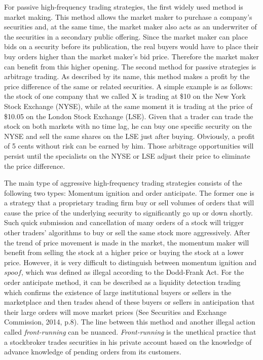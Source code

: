For passive high-frequency trading strategies,  the first widely used method is market making. This method allows the market maker to purchase a company's securities and,  at the same time,  the market maker also acts as an underwriter of the 
securities in a secondary public offering. Since the market maker can place bids on a security before its publication,  the real buyers would have to place their buy orders higher than the market maker's bid price. Therefore the market maker can  benefit from this higher opening. The second method for passive strategies is arbitrage trading. As described by its name,  this method makes a profit by the price difference of the same or related securities. A simple example is as follows: the stock of one company that we called X is trading at \$10 on the New York Stock Exchange (NYSE),  while at the same moment it is trading at the price of \$10.05 on the London Stock Exchange (LSE).  Given that a trader can trade the stock on both markets with no time lag,  he can buy one specific security on the NYSE and sell the same shares on the LSE just after buying. Obviously,  a profit of 5 cents without risk can be earned by him. Those arbitrage opportunities will persist until the specialists on the NYSE or LSE adjust their price to eliminate the price difference.

The main type of aggressive high-frequency trading strategies consists of the following two types:
Momentum ignition and order anticipate. The former one is a strategy that a proprietary trading firm buy or sell volumes of orders that will cause the price of the underlying security to significantly go up or down shortly. Such quick submission and cancellation of many orders of a stock will trigger other traders' algorithms to buy or sell the same stock more aggressively. After the trend of price movement is made in the market,  the momentum maker will benefit from selling the stock at a higher price or buying the stock at a lower price. However,  it is very difficult to distinguish between momentum ignition and $\textit{spoof}$,  which was defined as illegal according to the Dodd-Frank Act.  For the order anticipate method,  it can be described as a liquidity detection trading which confirms the existence of large institutional buyers or sellers in the marketplace and then trades ahead of these buyers or sellers in anticipation that their large orders will move market prices  (See Securities and Exchange Commission, 2014, p.8). The line between this method and another illegal action called \textit{front-running} can be nuanced. \textit{Front-running} is the unethical practice that a stockbroker trades securities in his private account based on the knowledge of advance knowledge of pending orders from its customers. 

